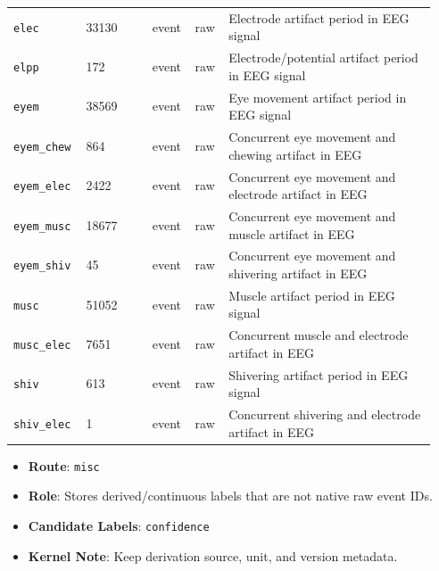 {\begin{tcolorbox}
\begin{tabular}{@{}p{0.1567\linewidth}p{0.1567\linewidth}p{0.0783\linewidth}p{0.0783\linewidth}p{0.4700\linewidth}@{}}
\texttt{elec} & 33130 & event & raw & Electrode artifact period in EEG signal \\
\texttt{elpp} & 172 & event & raw & Electrode/potential artifact period in EEG signal \\
\texttt{eyem} & 38569 & event & raw & Eye movement artifact period in EEG signal \\
\texttt{eyem\_\allowbreak{}chew} & 864 & event & raw & Concurrent eye movement and chewing artifact in EEG \\
\texttt{eyem\_\allowbreak{}elec} & 2422 & event & raw & Concurrent eye movement and electrode artifact in EEG \\
\texttt{eyem\_\allowbreak{}musc} & 18677 & event & raw & Concurrent eye movement and muscle artifact in EEG \\
\texttt{eyem\_\allowbreak{}shiv} & 45 & event & raw & Concurrent eye movement and shivering artifact in EEG \\
\texttt{musc} & 51052 & event & raw & Muscle artifact period in EEG signal \\
\texttt{musc\_\allowbreak{}elec} & 7651 & event & raw & Concurrent muscle and electrode artifact in EEG \\
\texttt{shiv} & 613 & event & raw & Shivering artifact period in EEG signal \\
\texttt{shiv\_\allowbreak{}elec} & 1 & event & raw & Concurrent shivering and electrode artifact in EEG \\
\bottomrule
\end{tabular}
\endgroup
\smallskip{}\par\smallskip
\begin{itemize}[leftmargin=1.4em,noitemsep,topsep=2pt]
\item{\footnotesize \textbf{Route}: \texttt{misc}}
\item{\footnotesize \textbf{Role}: Stores derived/continuous labels that are not native raw event IDs.}
\item{\footnotesize \textbf{Candidate Labels}: \texttt{confidence}}
\item{\footnotesize \textbf{Kernel Note}: Keep derivation source, unit, and version metadata.}
\end{itemize}
\smallskip{}\par\smallskip
\begingroup\scriptsize\setlength{\tabcolsep}{2pt}
\begin{tabular}{@{}p{0.2350\linewidth}p{0.2350\linewidth}p{0.4700\linewidth}@{}}

\end{tabular}
\end{tcolorbox}}
